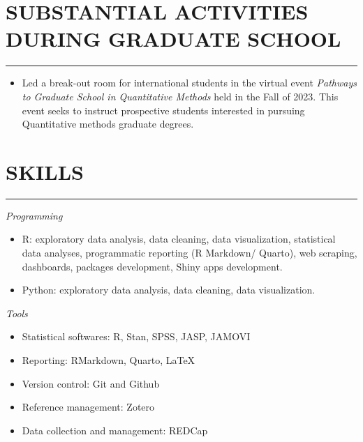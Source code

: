 \documentclass[10pt,]{article}
\providecommand{\tightlist}{%
  \setlength{\itemsep}{0pt}\setlength{\parskip}{0pt}}
\begin{document}
\section{SUBSTANTIAL ACTIVITIES DURING GRADUATE
SCHOOL}\label{substantial-activities-during-graduate-school}

\hrule

\begin{itemize}
\tightlist
\item
  Led a break-out room for international students in the virtual event
  \emph{Pathways to Graduate School in Quantitative Methods} held in the
  Fall of 2023. This event seeks to instruct prospective students
  interested in pursuing Quantitative methods graduate degrees.
\end{itemize}

\section{SKILLS}\label{skills}

\hrule

\emph{Programming}

\begin{itemize}
\tightlist
\item
  R: exploratory data analysis, data cleaning, data visualization,
  statistical data analyses, programmatic reporting (R Markdown/
  Quarto), web scraping, dashboards, packages development, Shiny apps
  development.
\item
  Python: exploratory data analysis, data cleaning, data visualization.
\end{itemize}

\emph{Tools}

\begin{itemize}
\tightlist
\item
  Statistical softwares: R, Stan, SPSS, JASP, JAMOVI
\item
  Reporting: RMarkdown, Quarto, \LaTeX
\item
  Version control: Git and Github
\item
  Reference management: Zotero
\item
  Data collection and management: REDCap
\end{itemize}
\end{document}
